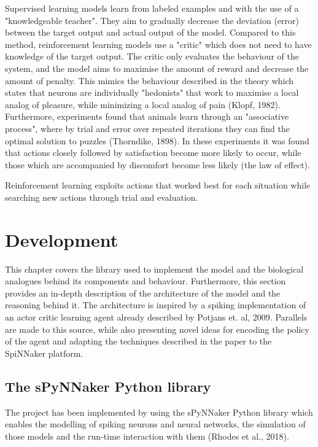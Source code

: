 \documentclass[10pt]{article}
\begin{document}
    Supervised learning models learn from labeled examples and with the use of a "knowledgeable teacher". They aim to gradually decrease the deviation (error) between the target output and actual output of the model. Compared to this method, reinforcement learning models use a "critic" which does not need to have knowledge of the target output. The critic only evaluates the behaviour of the system, and the model aims to maximise the amount of reward and decrease the amount of penalty. This mimics the behaviour described in the theory which states that neurons are individually "hedonists" that work to maximise a local analog of pleasure, while minimizing a local analog of pain (Klopf, 1982). Furthermore, experiments found that animals learn through an "associative process", where by trial and error over repeated iterations they can find the optimal solution to puzzles (Thorndike, 1898). In these experiments it was found that actions closely followed by satisfaction become more likely to occur, while those which are accompanied by discomfort become less likely (the law of effect).

    Reinforcement learning exploits actions that worked best for each situation while searching new actions through trial and evaluation.
    
    \section{Development}

    This chapter covers the library used to implement the model and the biological analogues behind its components and behaviour. Furthermore, this section provides an in-depth description of the architecture of the model and the reasoning behind it. The architecture is inspired by a spiking implementation of an actor critic learning agent already described by Potjans et. al, 2009. Parallels are made to this source, while also presenting novel ideas for encoding the policy of the agent and adapting the techniques described in the paper to the SpiNNaker platform.

    \subsection{The sPyNNaker Python library}

    The project has been implemented by using the sPyNNaker Python library which enables the modelling of spiking neurons and neural networks, the simulation of those models and the run-time interaction with them (Rhodes et al., 2018).
\end{document}
